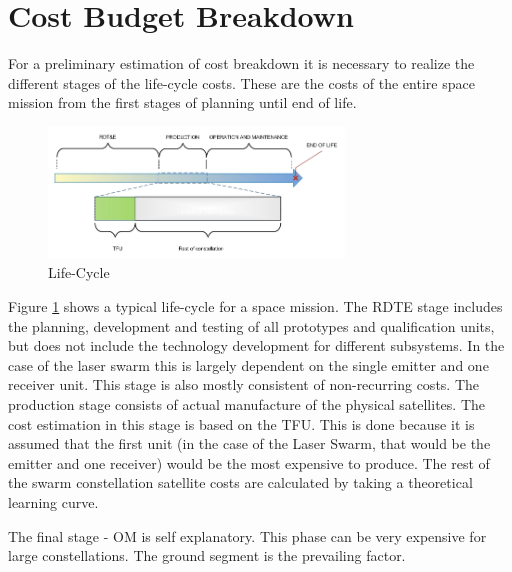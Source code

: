 \section{Cost Budget Breakdown}
\label{blBudgetCost}
For a preliminary estimation of cost breakdown it is necessary to realize the different stages of the life-cycle costs. These are the costs of the entire space mission from the first stages of planning until end of life.
%

\begin{figure}[b]
\begin{center}

\includegraphics[width=0.7\textwidth]{chapters/img/lifetime.jpg}
\caption{Life-Cycle}
\label{fig:lifecycle}
\end{center}
\end{figure}

Figure \ref{fig:lifecycle} shows a typical life-cycle for a space mission. The \ac{RDTE} stage includes the planning, development and testing of all prototypes and qualification units, but does not include the technology development for different subsystems. In the case of the laser swarm this is largely dependent on the single emitter and one receiver unit. This stage is also mostly consistent of non-recurring costs. The production stage consists of actual manufacture of the physical satellites. The cost estimation in this stage is based on the \ac{TFU}. This is done because it is assumed that the first unit (in the case of the Laser Swarm, that would be the emitter and one receiver) would be the most expensive to produce. The rest of the swarm constellation satellite costs are calculated by taking a theoretical learning curve\cite{larson}. 

The final stage - \ac{OM} is self explanatory. This phase can be very expensive for large constellations. The ground segment is the prevailing factor.

